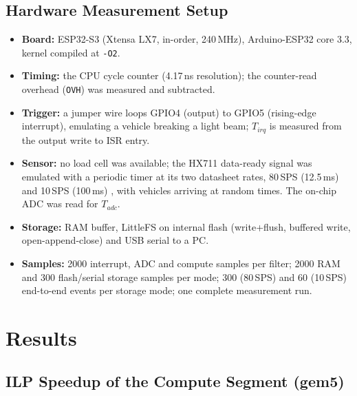 \documentclass[12pt, a4paper]{article}
\begin{document}
\subsection{Hardware Measurement Setup}
\begin{itemize}
    \item \textbf{Board:} ESP32-S3 (Xtensa LX7, in-order, 240\,MHz), Arduino-ESP32 core 3.3, kernel compiled at \texttt{-O2}.
    \item \textbf{Timing:} the CPU cycle counter (4.17\,ns resolution); the counter-read overhead (\texttt{OVH}) was measured and subtracted.
    \item \textbf{Trigger:} a jumper wire loops GPIO4 (output) to GPIO5 (rising-edge interrupt), emulating a vehicle breaking a light beam; $T_{irq}$ is measured from the output write to ISR entry.
    \item \textbf{Sensor:} no load cell was available; the HX711 data-ready signal was emulated with a periodic timer at its two datasheet rates, 80\,SPS (12.5\,ms) and 10\,SPS (100\,ms) \cite{HX711}, with vehicles arriving at random times. The on-chip ADC was read for $T_{adc}$.
    \item \textbf{Storage:} RAM buffer, LittleFS on internal flash (write+flush, buffered write, open-append-close) and USB serial to a PC.
    \item \textbf{Samples:} 2000 interrupt, ADC and compute samples per filter; 2000 RAM and 300 flash/serial storage samples per mode; 300 (80\,SPS) and 60 (10\,SPS) end-to-end events per storage mode; one complete measurement run.
\end{itemize}

\section{Results}

\subsection{ILP Speedup of the Compute Segment (gem5)}
\end{document}
